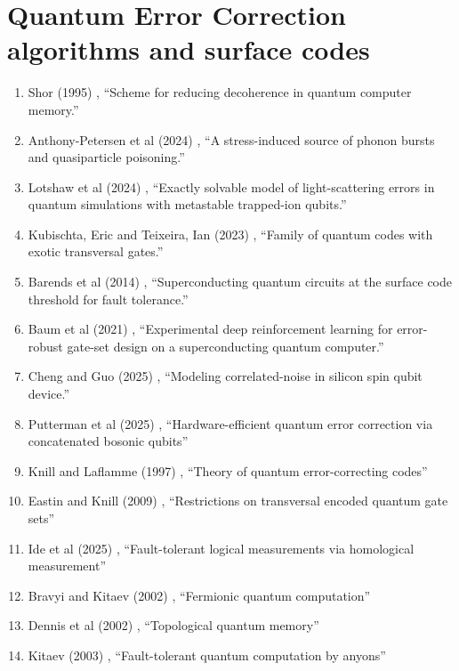 \documentclass[a4paper,fleqn]{cas-sc}
\begin{document}
\section{Quantum Error Correction algorithms and surface codes}

\begin{enumerate}
\item Shor (1995) \cite{shor1995scheme}, ``Scheme for reducing decoherence in quantum computer memory.''
\item Anthony-Petersen et al (2024) \cite{anthony2024stress}, ``A stress-induced source of phonon bursts and quasiparticle poisoning.''
\item Lotshaw et al (2024) \cite{PhysRevA.110.L030803}, ``Exactly solvable model of light-scattering errors in quantum simulations with metastable trapped-ion qubits.''
\item Kubischta, Eric and Teixeira, Ian (2023) 
\cite{kubischta2023family}, 
``Family of quantum codes with exotic transversal gates.''
\item Barends et al (2014) \cite{barends2014superconducting}, ``Superconducting quantum circuits at the surface code threshold for fault tolerance.''
\item Baum et al (2021) \cite{baum2021experimental}, ``Experimental deep reinforcement learning for error-robust gate-set design on a superconducting quantum computer.''
\item Cheng and Guo (2025) \cite{cheng2025modeling}, ``Modeling correlated-noise in silicon spin qubit device.''
\item Putterman et al (2025) \cite{Putterman_2025}, ``Hardware-efficient quantum error correction via concatenated bosonic qubits''
\item Knill and Laflamme (1997) \cite{knill1997theory}, ``Theory of quantum error-correcting codes''
\item Eastin and Knill (2009) \cite{eastin2009restrictions}, ``Restrictions on transversal encoded quantum gate sets''
\item Ide et al (2025) \cite{ide2025fault}, ``Fault-tolerant logical measurements via homological measurement''
\item Bravyi and Kitaev (2002) \cite{bravyi2002fermionic}, ``Fermionic quantum computation''
\item Dennis et al (2002) \cite{dennis2002topological}, ``Topological quantum memory''
\item Kitaev (2003) \cite{kitaev2003fault}, ``Fault-tolerant quantum computation by anyons''

\end{enumerate}
\end{document}
